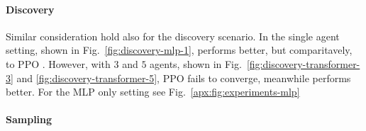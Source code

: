 \paragraph{Discovery}
Similar consideration hold also for the discovery scenario. In the single agent setting, shown in Fig.~\ref{fig:discovery-mlp-1}, \fname{} performs better, but comparitavely, to PPO . However, with $3$ and $5$ agents, shown in Fig.~\ref{fig:discovery-transformer-3} and \ref{fig:discovery-transformer-5}, PPO fails to converge, meanwhile \fname{} performs better. For the MLP only setting see Fig.~\ref{apx:fig:experiments-mlp} 

\paragraph{Sampling}


